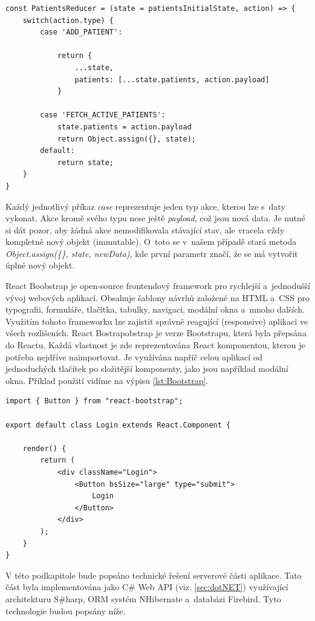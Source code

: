 \begin{lstlisting}[numbers=none, caption={Reducer funkce}]
const PatientsReducer = (state = patientsInitialState, action) => {
	switch(action.type) {
		case 'ADD_PATIENT':    
		
			return { 
				...state,
				patients: [...state.patients, action.payload]
			}
		
		case 'FETCH_ACTIVE_PATIENTS':
			state.patients = action.payload
			return Object.assign({}, state);
		default:
			return state;
	}
}
\end{lstlisting}

Každý jednotlivý příkaz \textit{case} reprezentuje jeden typ akce, kterou lze s~daty vykonat.
Akce kromě svého typu nese ještě \textit{payload}, což jsou nová data. Je nutné si dát pozor, aby žádná akce nemodifikovala stávající stav,
ale vracela vždy kompletně nový objekt (immutable). O~toto se v~našem případě stará metoda \textit{Object.assign(\{\}, state, newData)}, kde první parametr značí, že se má vytvořit úplně nový objekt. \\


React Boobstrap je open-source frontendový framework pro rychlejší a~jednodušší vývoj webových aplikací. Obsahuje šablony návrhů založené na HTML a~CSS pro typografii, formuláře, tlačítka, tabulky, navigaci, modální okna a~mnoho dalších. Využitím tohoto frameworku lze zajistit správně reagující (responsive) aplikaci ve všech rozlišeních. React Bostrapobstrap je verze Bootstrapu, která byla přepsána do Reactu. Každá vlastnost je zde reprezentována React komponentou, kterou je potřeba nejdříve naimportovat. Je využívána napříč celou aplikací od jednoduchých tlačítek po složitější komponenty, jako jsou například modální okna. Příklad použití vidíme na výpisu \ref{lst:Bootstrap}.

\begin{lstlisting}[numbers=none, caption={Ukázka React Bootstrap}, label=lst:Bootstrap]
import { Button } from "react-bootstrap";

export default class Login extends React.Component {

	render() {
		return (
			<div className="Login">
				<Button bsSize="large" type="submit">
					Login
				</Button>
			</div>
		);
	}
}
\end{lstlisting}



V této podkapitole bude popsáno technické řešení serverové části aplikace. Tato část byla implementována jako C\# Web API (viz. \ref{sec:dotNET}) využívající architekturu S\#harp, ORM systém NHibernate a~databázi Firebird. Tyto technologie budou popsány níže. \\

